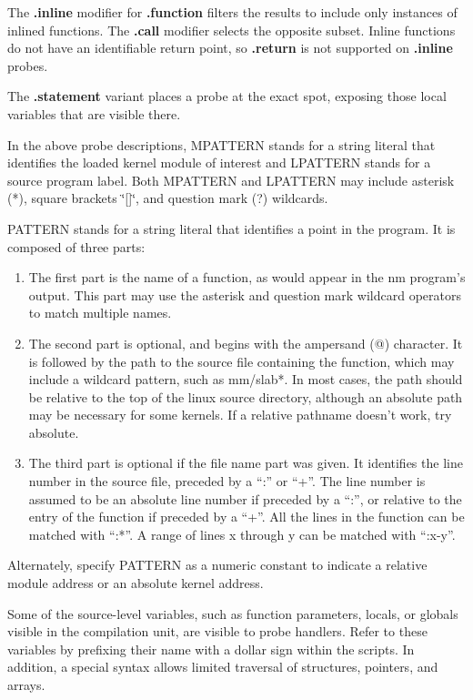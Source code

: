 \documentclass[twoside,english]{article}
\begin{document}
The \textbf{.inline} modifier for \textbf{.function} filters the results to include only
instances of inlined functions. The \textbf{.call} modifier selects the opposite subset.
Inline functions do not have an identifiable return point, so \textbf{.return}
is not supported on \textbf{.inline} probes.

The \textbf{.statement} variant places a probe at the exact spot, exposing those local
variables that are visible there.

In the above probe descriptions, MPATTERN stands for a string literal
that identifies the loaded kernel module of interest and LPATTERN
stands for a source program label. Both MPATTERN and LPATTERN may
include asterisk ({*}), square brackets \char`\"{}{[}]\char`\"{}, and
question mark (?) wildcards.

PATTERN stands for a string literal that identifies a point in the program.
It is composed of three parts:

\begin{enumerate}
\item The first part is the name of a function, as would appear in the nm program's
output. This part may use the asterisk and question mark wildcard operators
to match multiple names.
\item The second part is optional, and begins with the ampersand (@) character.
It is followed by the path to the source file containing the function,
which may include a wildcard pattern, such as mm/slab{*}.
In most cases, the path should be relative to the top of the
linux source directory, although an absolute path may be necessary for some kernels.
If a relative pathname doesn't work, try absolute.
\item The third part is optional if the file name part was given. It identifies
the line number in the source file, preceded by a ``:'' or ``+''.
The line number is assumed to be an
absolute line number if preceded by a ``:'', or relative to the entry of
the function if preceded by a ``+''.
All the lines in the function can be matched with ``:*''.
A range of lines x through y can be matched with ``:x-y''.

\end{enumerate}
Alternately, specify PATTERN as a numeric constant to indicate a relative
module address or an absolute kernel address.

Some of the source-level variables, such as function parameters, locals,
or globals visible in the compilation unit, are visible to probe handlers.
Refer to these variables by prefixing their name with a dollar sign within
the scripts. In addition, a special syntax allows limited traversal of structures,
pointers, and arrays.
\end{document}
